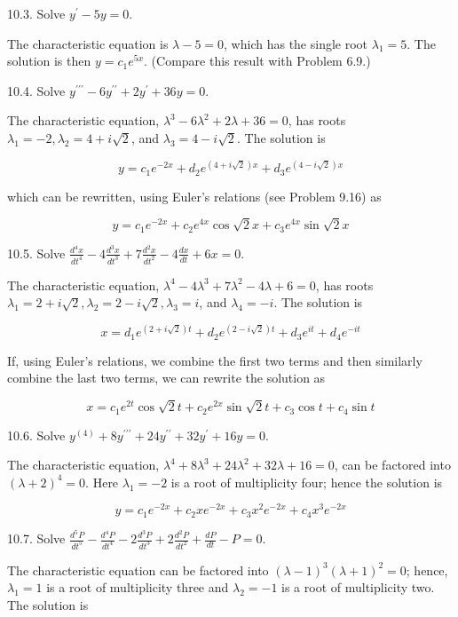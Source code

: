 \documentclass[10pt]{article}
\begin{document}
10.3. Solve $y^{\prime}-5 y=0$.

The characteristic equation is $\lambda-5=0$, which has the single root $\lambda_{1}=5$. The solution is then $y=c_{1} e^{5 x}$. (Compare this result with Problem 6.9.)

10.4. Solve $y^{\prime \prime \prime}-6 y^{\prime \prime}+2 y^{\prime}+36 y=0$.

The characteristic equation, $\lambda^{3}-6 \lambda^{2}+2 \lambda+36=0$, has roots $\lambda_{1}=-2, \lambda_{2}=4+i \sqrt{2}$, and $\lambda_{3}=4-i \sqrt{2}$. The solution is

$$
y=c_{1} e^{-2 x}+d_{2} e^{(4+i \sqrt{2}) x}+d_{3} e^{(4-i \sqrt{2}) x}
$$

which can be rewritten, using Euler's relations (see Problem 9.16) as

$$
y=c_{1} e^{-2 x}+c_{2} e^{4 x} \cos \sqrt{2} x+c_{3} e^{4 x} \sin \sqrt{2} x
$$

10.5. Solve $\frac{d^{4} x}{d t^{4}}-4 \frac{d^{3} x}{d t^{3}}+7 \frac{d^{2} x}{d t^{2}}-4 \frac{d x}{d t}+6 x=0$.

The characteristic equation, $\lambda^{4}-4 \lambda^{3}+7 \lambda^{2}-4 \lambda+6=0$, has roots $\lambda_{1}=2+i \sqrt{2}, \lambda_{2}=2-i \sqrt{2}, \lambda_{3}=i$, and $\lambda_{4}=-i$. The solution is

$$
x=d_{1} e^{(2+i \sqrt{2}) t}+d_{2} e^{(2-i \sqrt{2}) t}+d_{3} e^{i t}+d_{4} e^{-i t}
$$

If, using Euler's relations, we combine the first two terms and then similarly combine the last two terms, we can rewrite the solution as

$$
x=c_{1} e^{2 t} \cos \sqrt{2} t+c_{2} e^{2 x} \sin \sqrt{2} t+c_{3} \cos t+c_{4} \sin t
$$

10.6. Solve $y^{(4)}+8 y^{\prime \prime \prime}+24 y^{\prime \prime}+32 y^{\prime}+16 y=0$.

The characteristic equation, $\lambda^{4}+8 \lambda^{3}+24 \lambda^{2}+32 \lambda+16=0$, can be factored into $(\lambda+2)^{4}=0$. Here $\lambda_{1}=-2$ is a root of multiplicity four; hence the solution is

$$
y=c_{1} e^{-2 x}+c_{2} x e^{-2 x}+c_{3} x^{2} e^{-2 x}+c_{4} x^{3} e^{-2 x}
$$

10.7. Solve $\frac{d^{5} P}{d t^{5}}-\frac{d^{4} P}{d t^{4}}-2 \frac{d^{3} P}{d t^{3}}+2 \frac{d^{2} P}{d t^{2}}+\frac{d P}{d t}-P=0$.

The characteristic equation can be factored into $(\lambda-1)^{3}(\lambda+1)^{2}=0$; hence, $\lambda_{1}=1$ is a root of multiplicity three and $\lambda_{2}=-1$ is a root of multiplicity two. The solution is
\end{document}
